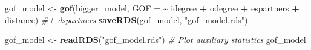 \documentclass[
]{article}
\newenvironment{Shaded}{\begin{snugshade}}{\end{snugshade}}
\newcommand{\AttributeTok}[1]{\textcolor[rgb]{0.13,0.29,0.53}{#1}}
\newcommand{\CommentTok}[1]{\textcolor[rgb]{0.56,0.35,0.01}{\textit{#1}}}
\newcommand{\FunctionTok}[1]{\textcolor[rgb]{0.13,0.29,0.53}{\textbf{#1}}}
\newcommand{\NormalTok}[1]{#1}
\newcommand{\OtherTok}[1]{\textcolor[rgb]{0.56,0.35,0.01}{#1}}
\newcommand{\SpecialCharTok}[1]{\textcolor[rgb]{0.81,0.36,0.00}{\textbf{#1}}}
\newcommand{\StringTok}[1]{\textcolor[rgb]{0.31,0.60,0.02}{#1}}
\begin{document}
\begin{Shaded}
\begin{Highlighting}[]
\NormalTok{gof\_model }\OtherTok{\textless{}{-}} \FunctionTok{gof}\NormalTok{(bigger\_model, }\AttributeTok{GOF =} \SpecialCharTok{\textasciitilde{}}\NormalTok{ idegree }\SpecialCharTok{+}\NormalTok{ odegree }\SpecialCharTok{+}\NormalTok{ espartners }\SpecialCharTok{+}\NormalTok{ distance) }\CommentTok{\#+ dspartners}
\FunctionTok{saveRDS}\NormalTok{(gof\_model, }\StringTok{"gof\_model.rds"}\NormalTok{)}
\end{Highlighting}
\end{Shaded}

\begin{Shaded}
\begin{Highlighting}[]
\NormalTok{gof\_model }\OtherTok{\textless{}{-}} \FunctionTok{readRDS}\NormalTok{(}\StringTok{"gof\_model.rds"}\NormalTok{)}
\CommentTok{\# Plot auxiliary statistics}
\NormalTok{gof\_model}
\end{Highlighting}
\end{Shaded}
\end{document}
